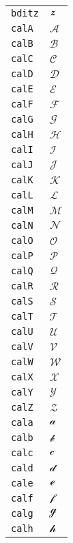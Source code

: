 \begin{longtable}{ll}
\texttt{bditz}&${}{\textbf{\textit{z}}}{}$\\
\texttt{calA}&${}{\mathcal{A}}{}$\\
\texttt{calB}&${}{\mathcal{B}}{}$\\
\texttt{calC}&${}{\mathcal{C}}{}$\\
\texttt{calD}&${}{\mathcal{D}}{}$\\
\texttt{calE}&${}{\mathcal{E}}{}$\\
\texttt{calF}&${}{\mathcal{F}}{}$\\
\texttt{calG}&${}{\mathcal{G}}{}$\\
\texttt{calH}&${}{\mathcal{H}}{}$\\
\texttt{calI}&${}{\mathcal{I}}{}$\\
\texttt{calJ}&${}{\mathcal{J}}{}$\\
\texttt{calK}&${}{\mathcal{K}}{}$\\
\texttt{calL}&${}{\mathcal{L}}{}$\\
\texttt{calM}&${}{\mathcal{M}}{}$\\
\texttt{calN}&${}{\mathcal{N}}{}$\\
\texttt{calO}&${}{\mathcal{O}}{}$\\
\texttt{calP}&${}{\mathcal{P}}{}$\\
\texttt{calQ}&${}{\mathcal{Q}}{}$\\
\texttt{calR}&${}{\mathcal{R}}{}$\\
\texttt{calS}&${}{\mathcal{S}}{}$\\
\texttt{calT}&${}{\mathcal{T}}{}$\\
\texttt{calU}&${}{\mathcal{U}}{}$\\
\texttt{calV}&${}{\mathcal{V}}{}$\\
\texttt{calW}&${}{\mathcal{W}}{}$\\
\texttt{calX}&${}{\mathcal{X}}{}$\\
\texttt{calY}&${}{\mathcal{Y}}{}$\\
\texttt{calZ}&${}{\mathcal{Z}}{}$\\
\texttt{cala}&${}{\mathcal{a}}{}$\\
\texttt{calb}&${}{\mathcal{b}}{}$\\
\texttt{calc}&${}{\mathcal{c}}{}$\\
\texttt{cald}&${}{\mathcal{d}}{}$\\
\texttt{cale}&${}{\mathcal{e}}{}$\\
\texttt{calf}&${}{\mathcal{f}}{}$\\
\texttt{calg}&${}{\mathcal{g}}{}$\\
\texttt{calh}&${}{\mathcal{h}}{}$\\

\end{longtable}
